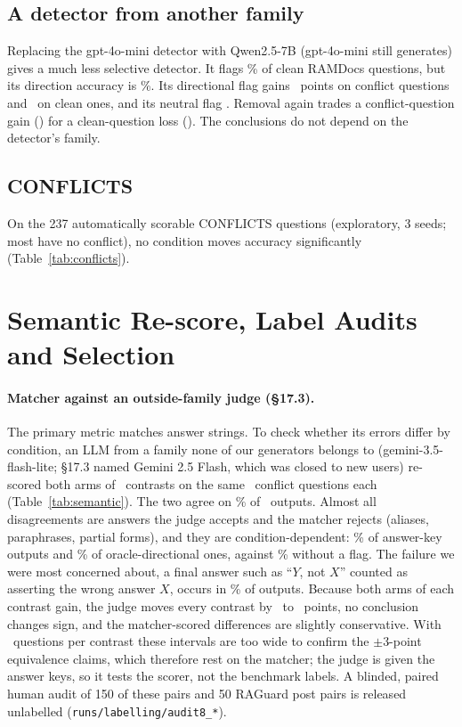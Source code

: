 \subsection{A detector from another family}
Replacing the gpt-4o-mini detector with Qwen2.5-7B (gpt-4o-mini still generates) gives a much less selective
detector. It flags \qdetFpr\% of clean RAMDocs questions, but its direction accuracy is \qdetDir\%. Its directional
flag gains \zQDetLlmDirFlagDirectionalConflict\ points on conflict questions and \zQDetLlmDirFlagDirectionalClean\ on
clean ones, and its neutral flag \zQDetLlmDirFlagConflict. Removal again trades a conflict-question gain
(\zQDetLlmDirRemoveSuspectConflict) for a clean-question loss (\zQDetLlmDirRemoveSuspectClean). The conclusions do
not depend on the detector's family.

\subsection{CONFLICTS}
On the 237 automatically scorable CONFLICTS questions (exploratory, 3 seeds; most have no conflict), no condition
moves accuracy significantly (Table~\ref{tab:conflicts}).

\section{Semantic Re-score, Label Audits and Selection}
\label{app:semantic}

\paragraph{Matcher against an outside-family judge (\S17.3).} The primary metric matches answer strings. To check
whether its errors differ by condition, an LLM from a family none of our generators belongs to (gemini-3.5-flash-lite;
\S17.3 named Gemini 2.5 Flash, which was closed to new users) re-scored both arms of \semK\ contrasts on the same
\semNq\ conflict questions each (Table~\ref{tab:semantic}). The two agree on \semAgree\% of \semN\ outputs. Almost all
disagreements are answers the judge accepts and the matcher rejects (aliases, paraphrases, partial forms), and they
are condition-dependent: \semJudgeOnlyKey\% of answer-key outputs and \semJudgeOnlyDir\% of oracle-directional ones,
against \semJudgeOnlyPlain\% without a flag. The failure we were most concerned about, a final answer such as
``$Y$, not $X$'' counted as asserting the wrong answer $X$, occurs in \semRejected\% of outputs. Because
both arms of each contrast gain, the judge moves every contrast by \semDidMin\ to \semDidMax\ points, no conclusion
changes sign, and the matcher-scored differences are slightly conservative. With \semNq\ questions per contrast these
intervals are too wide to confirm the $\pm$3-point equivalence claims, which therefore rest on the matcher; the
judge is given the answer keys, so it tests the scorer, not the benchmark labels. A blinded, paired human audit of
150 of these pairs and 50 RAGuard post pairs is released unlabelled (\texttt{runs/labelling/audit8\_*}).


